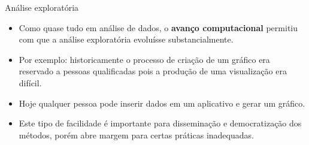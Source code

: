 \documentclass[
  ignorenonframetext,
  serif,
  professionalfont,
  usenames,
  dvipsnames,
  aspectratio = 169]{beamer}
\begin{document}
\begin{frame}{Análise exploratória}
\label{anuxe1lise-exploratuxf3ria-2}
\begin{itemize}
\item
  Como quase tudo em análise de dados, o \textbf{avanço computacional}
  permitiu com que a análise exploratória evoluísse substancialmente.
\item
  Por exemplo: historicamente o processo de criação de um gráfico era
  reservado a pessoas qualificadas pois a produção de uma visualização
  era difícil.
\item
  Hoje qualquer pessoa pode inserir dados em um aplicativo e gerar um
  gráfico.
\item
  Este tipo de facilidade é importante para disseminação e
  democratização dos métodos, porém abre margem para certas práticas
  inadequadas.
\end{itemize}
\end{frame}
\end{document}
